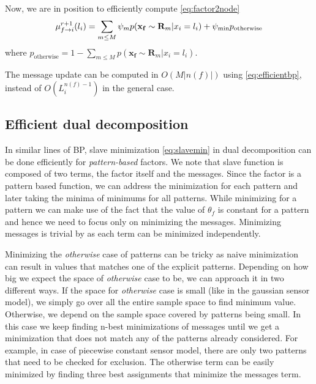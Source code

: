 \documentclass[letterpaper, 10 pt, conference]{ieeeconf} %
\newcommand{\vect}[1]{\mathbf{#1}}
\begin{document}
Now, we are in position to efficiently compute \eqref{eq:factor2node}
\begin{multline}
  \bpmsg{f}{i}{l_i}{r+1} = \sum_{m \le M} \psi_m p(\vect{x_f} \sim \vect{R}_m|x_i = l_i)
  + \psi_{\text{min}} p_{\text{otherwise}}
  \label{eq:efficientbp}
\end{multline}
where $p_{\text{otherwise}} = 1 - \sum_{m \le M}p(\vect{x_f} \sim \vect{R}_m|x_i = l_i)$.

The message update can be computed in $O(M|n(f)|)$ using \eqref{eq:efficientbp}, instead of $O(L_i^{n(f)-1})$ in the general case.

\subsection{Efficient dual decomposition}
In similar lines of BP, slave minimization \eqref{eq:slavemin} in dual
decomposition can be done efficiently for \emph{pattern-based} factors.
We note that slave function is composed of two terms, the factor itself and
the messages. Since the factor is a pattern based function, we can address
the minimization for each pattern and later taking the minima of minimums for
all patterns. While minimizing for a pattern we can make use of the fact that
the value of $\theta_f$ is constant for a pattern and hence we need to focus
only on minimizing the messages. Minimizing messages is trivial by
as each term can be minimized independently.

Minimizing the \emph{otherwise} case of patterns can be tricky as naive
minimization can result in values that matches one of the explicit patterns.
Depending on how big we expect the space of \emph{otherwise} case to be, we
can approach it in two different ways.  If the space for \emph{otherwise} case
is small (like in the gaussian sensor model), we simply go over all the entire
sample space to find minimum value. Otherwise, we depend on the sample space
covered by patterns being small. In this case we keep finding n-best
minimizations of messages until we get a minimization that does not match any
of the patterns already considered.  
For example, in case of piecewise constant sensor model, there are only two
patterns that need to be checked for exclusion. The otherwise term can be
easily minimized by finding three best assignments that minimize the messages
term.
\end{document}
